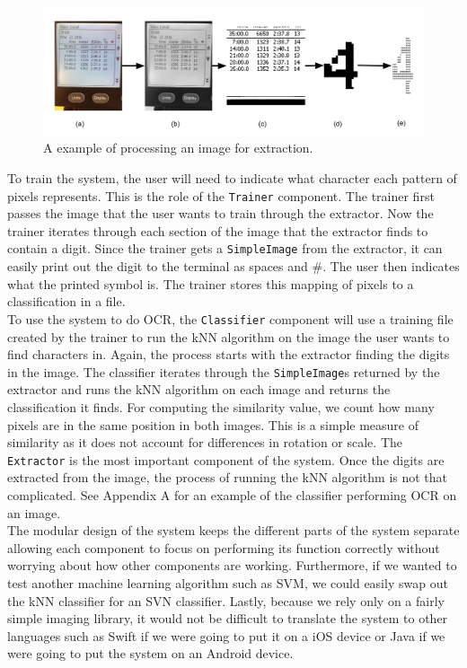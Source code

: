 \documentclass[a4paper,12pt]{article}
\begin{document}
\begin{figure}[h]
    \centering
    \includegraphics[width=\textwidth]{extraction}
    \caption{A example of processing an image for extraction.}
    \label{fig:extraction}
\end{figure}

To train the system, the user will need to indicate what character each pattern of pixels represents. This is the role of the \texttt{Trainer} component. The trainer first passes the image that the user wants to train through the extractor. Now the trainer iterates through each section of the image that the extractor finds to contain a digit. Since the trainer gets a \texttt{SimpleImage} from the extractor, it can easily print out the digit to the terminal as spaces and \#. The user then indicates what the printed symbol is. The trainer stores this mapping of pixels to a classification in a file. \\

To use the system to do OCR, the \texttt{Classifier} component will use a training file created by the trainer to run the kNN algorithm on the image the user wants to find characters in. Again, the process starts with the extractor finding the digits in the image. The classifier iterates through the \texttt{SimpleImage}s returned by the extractor and runs the kNN algorithm on each image and returns the classification it finds. For computing the similarity value, we count how many pixels are in the same position in both images. This is a simple measure of similarity as it does not account for differences in rotation or scale. The \texttt{Extractor} is the most important component of the system. Once the digits are extracted from the image, the process of running the kNN algorithm is not that complicated. See Appendix A for an example of the classifier performing OCR on an image. \\


The modular design of the system keeps the different parts of the system separate allowing each component to focus on performing its function correctly without worrying about how other components are working. Furthermore, if we wanted to test another machine learning algorithm such as SVM, we could easily swap out the kNN classifier for an SVN classifier. Lastly, because we rely only on a fairly simple imaging library, it would not be difficult to translate the system to other languages such as Swift if we were going to put it on a iOS device or Java if we were going to put the system on an Android device.
\end{document}
